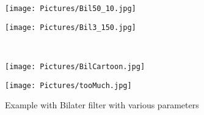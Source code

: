 \documentclass[11pt,a4paper]{article}
\begin{document}
  \begin{figure}[htbp]
    \centering
    \begin{minipage}{0.5\textwidth}
      \centering
    \texttt{[image: Pictures/Bil50\_10.jpg]}
    \end{minipage}%
\begin{minipage}{0.5\textwidth}
  \centering
\texttt{[image: Pictures/Bil3\_150.jpg]}
\label{fig:lessGrany}
\end{minipage}\\
    \begin{minipage}{0.5\textwidth}
      \centering
    \texttt{[image: Pictures/BilCartoon.jpg]}
    \label{fig:cartoon}
      \end{minipage}%
      \begin{minipage}{0.5\textwidth}
        \centering
      \texttt{[image: Pictures/tooMuch.jpg]}
      \label{fig:tooMuch}
        \end{minipage}
    \caption{Example with Bilater filter with various parameters}
    \end{figure}     
\end{document}
